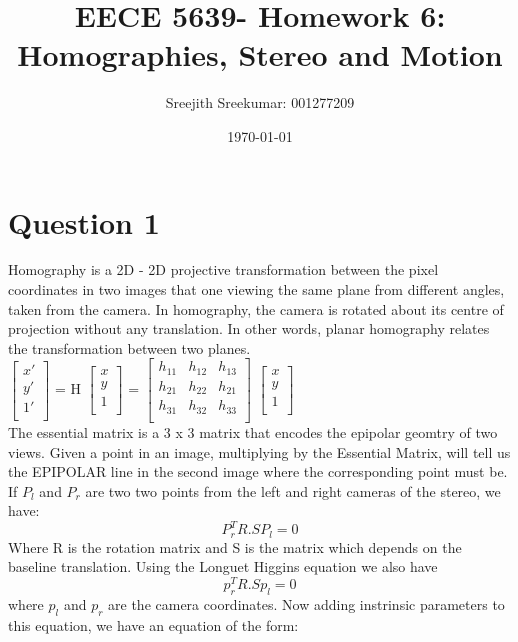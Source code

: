 \documentclass{article}
\title{EECE 5639- Homework 6: Homographies, Stereo and Motion}
\author{Sreejith Sreekumar: 001277209}
\date{\today}
\begin{document}
\maketitle

\section*{Question 1}
Homography is a 2D - 2D projective transformation between the pixel coordinates in two images that one
viewing the same plane from different angles, taken from the camera. In homography, the camera is rotated
about its centre of projection without any translation. In other words, planar homography relates the transformation between two planes. \\

$\begin{bmatrix}
    x'\\
    y'\\
    1'\\
\end{bmatrix}$ = H $\begin{bmatrix}
    x\\
    y\\
    1\\
\end{bmatrix}$ = $\begin{bmatrix}
    h_{11} &  h_{12} &  h_{13}\\
    h_{21} &  h_{22} &  h_{21}\\
    h_{31} &  h_{32} &  h_{33}\\
\end{bmatrix}$ $\begin{bmatrix}
    x\\
    y\\
    1\\
\end{bmatrix}$ \\

The essential matrix is a 3 x 3 matrix that encodes the epipolar geomtry of two views. Given a point
in an image, multiplying by the Essential Matrix, will tell us the EPIPOLAR line in the second image
where the corresponding point must be.
If $P_{l}$ and $P_{r}$ are two two points from the left and right cameras of the stereo, we have:
\[
P_{r}^{T} R.S P_{l} = 0
\]
Where R is the rotation matrix and S is the matrix which depends on the baseline translation. Using the
Longuet Higgins equation we also have
\[
p_{r}^{T} R.S p_{l} = 0
\]
where $p_{l}$ and $p_{r}$ are the camera coordinates. Now adding instrinsic parameters to this equation,
we have an equation of the form:
\end{document}

